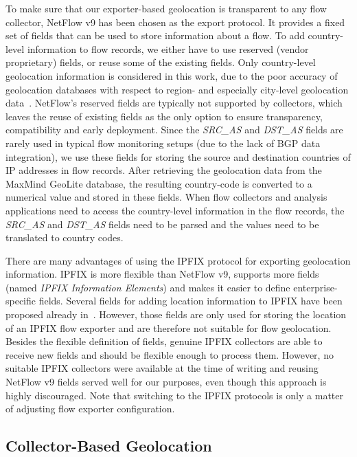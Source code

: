 To make sure that our exporter-based geolocation is transparent to any flow collector, NetFlow v9 has been chosen as the export protocol. It provides a fixed set of fields that can be used to store information about a flow. To add country-level information to flow records, we either have to use reserved (vendor proprietary) fields, or reuse some of the existing fields. Only country-level geolocation information is considered in this work, due to the poor accuracy of geolocation databases with respect to region- and especially city-level geolocation data~\cite{Poese-2011-IP}. NetFlow's reserved fields are typically not supported by collectors, which leaves the reuse of existing fields as the only option to ensure transparency, compatibility and early deployment. Since the \textit{SRC\_AS} and \textit{DST\_AS} fields are rarely used in typical flow monitoring setups (due to the lack of BGP data integration), we use these fields for storing the source and destination countries of IP addresses in flow records. After retrieving the geolocation data from the MaxMind GeoLite database, the resulting country-code is converted to a numerical value and stored in these fields. When flow collectors and analysis applications need to access the country-level information in the flow records, the \textit{SRC\_AS} and \textit{DST\_AS} fields need to be parsed and the values need to be translated to country codes.

There are many advantages of using the IPFIX protocol for exporting geolocation information. IPFIX is more flexible than NetFlow v9, supports more fields (named \textit{IPFIX Information Elements}) and makes it easier to define enterprise-specific fields. Several fields for adding location information to IPFIX have been proposed already in~\cite{draft-irtf-nmrg-location-ipfix-00}. However, those fields are only used for storing the location of an IPFIX flow exporter and are therefore not suitable for flow geolocation. Besides the flexible definition of fields, genuine IPFIX collectors are able to receive new fields and should be flexible enough to process them. However, no suitable IPFIX collectors were available at the time of writing and reusing NetFlow v9 fields served well for our purposes, even though this approach is highly discouraged. Note that switching to the IPFIX protocols is only a matter of adjusting flow exporter configuration.

\subsection{Collector-Based Geolocation} \label{subsec:geo-collector_based_geolocation}

